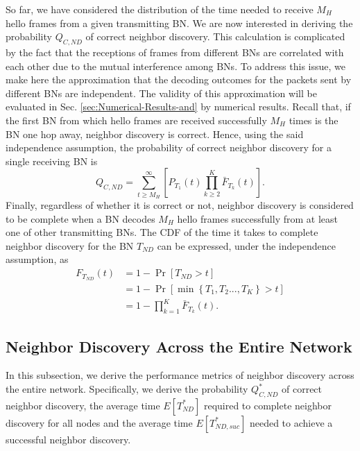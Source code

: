 \documentclass[10pt,english,two column]{IEEEtran}
\begin{document}
So far, we have considered the distribution of the time needed to
receive $M_{H}$ hello frames from a given transmitting BN. We are
now interested in deriving the probability $Q_{C,ND}$ of correct
neighbor discovery. This calculation is complicated by the fact that
the receptions of frames from different BNs are correlated with each
other due to the mutual interference among BNs. To address this issue,
we make here the approximation that the decoding outcomes for the
packets sent by different BNs are independent. The validity of this
approximation will be evaluated in Sec. \ref{sec:Numerical-Results-and}
by numerical results. Recall that, if the first BN from which hello
frames are received successfully $M_{H}$ times is the BN one hop
away, neighbor discovery is correct. Hence, using the said independence
assumption, the probability of correct neighbor discovery for a single
receiving BN is 
\begin{equation}
Q_{C,ND}=\sum_{t\geq M_{H}}^{\infty}\left[P_{T_{1}}\left(t\right)\prod_{k\geq2}^{K}\bar{F}_{T_{k}}(t)\right].\label{eq:PCN_oneNode}
\end{equation}
Finally, regardless of whether it is correct or not, neighbor discovery
is considered to be complete when a BN decodes $M_{H}$ hello frames
successfully from at least one of other transmitting BNs. The CDF
of the time it takes to complete neighbor discovery for the BN $T_{ND}$
can be expressed, under the independence assumption, as 
\begin{align}
F_{T_{ND}}\left(t\right) & =1-\Pr\left[T_{ND}>t\right]\nonumber \\
 & =1-\Pr\left[\mathrm{\min}\left\{ T_{1},T_{2}...,T_{K}\right\} >t\right]\nonumber \\
 & =1-\prod_{k=1}^{K}\bar{F}_{T_{k}}(t).\label{eq:CDF_T_oneNode}
\end{align}



\subsection{Neighbor Discovery Across the Entire Network\label{par:ND noInter allBNs}}

In this subsection, we derive the performance metrics of neighbor
discovery across the entire network. Specifically, we derive the probability
$Q_{C,ND}^{*}$ of correct neighbor discovery, the average time $E[T_{ND}^{*}]$
required to complete neighbor discovery for all nodes and the average
time $E[T_{ND,\mathrm{\mathit{suc}}}^{*}]$ needed to achieve a successful
neighbor discovery. 
\end{document}
